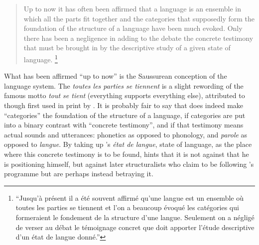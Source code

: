 \documentclass[output=paper]{langscibook}
\begin{document}
\begin{quotation}
Up to now it has often been affirmed that a language is an ensemble in which all the parts fit together and the categories that supposedly form the foundation of the structure of a language have been much evoked. Only there has been a negligence in adding to the debate the concrete testimony that must be brought in by the descriptive study of a given state of language. \citep[7]{Sauvageot1946}\footnote{``Jusqu'à présent il a été souvent affirmé qu'une langue est un ensemble où toutes les parties se tiennent et l'on a beaucoup évoqué les catégories qui formeraient le fondement de la structure d'une langue. Seulement on a négligé de verser au débat le témoignage concret que doit apporter l'étude descriptive d'un état de langue donné.''}
\end{quotation}

\largerpage 
What has been affirmed ``up to now'' is the Saussurean conception of the language system. The \emph{toutes les parties se tiennent} is a slight rewording of the famous motto \emph{tout se tient} (everything supports everything else), attributed to {\Saussure} though first used in print by \citet[407]{Meillet1903}. It is probably fair to say that  does indeed make ``categories'' the foundation of the structure of a language, if categories are put into a binary contrast with ``concrete testimony'', and if that testimony means actual sounds and utterances: phonetics as opposed to phonology, and \emph{parole} as opposed to \emph{langue}. By taking up {\Saussure}'s \emph{état de langue}, state of language, as the place where this concrete testimony is to be found, {\Sauvageot} hints that it is not against {\Saussure} that he is positioning himself, but against later structuralists who claim to be following {\Saussure}'s programme but are perhaps instead betraying it.
\end{document}
